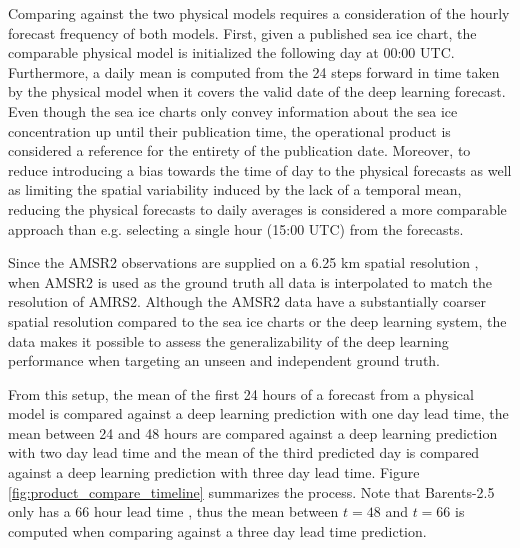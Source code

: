 \documentclass[../main/thesis.tex]{subfiles}
\begin{document}
Comparing against the two physical models requires a consideration of the hourly forecast frequency \citep{Williams2021, Roehrs2022} of both models. First, given a published sea ice chart, the comparable physical model is initialized the following day at 00:00 UTC. Furthermore, a daily mean is computed from the 24 steps forward in time taken by the physical model when it covers the valid date of the deep learning forecast. Even though the sea ice charts only convey information about the sea ice concentration up until their publication time, the operational product is considered a reference for the entirety of the publication date. Moreover, to reduce introducing a bias towards the time of day to the physical forecasts as well as limiting the spatial variability induced by the lack of a temporal mean, reducing the physical forecasts to daily averages is considered a more comparable approach than e.g. selecting a single hour (15:00 UTC) from the forecasts.

Since the AMSR2 observations are supplied on a 6.25 km spatial resolution \citep{Spreen2008}, when AMSR2 is used as the ground truth all data is interpolated to match the resolution of AMRS2. Although the AMSR2 data have a substantially coarser spatial resolution compared to the sea ice charts or the deep learning system, the data makes it possible to assess the generalizability of the deep learning performance when targeting an unseen and independent ground truth.

From this setup, the mean of the first 24 hours of a forecast from a physical model is compared against a deep learning prediction with one day lead time, the mean between 24 and 48 hours are compared against a deep learning prediction with two day lead time and the mean of the third predicted day is compared against a deep learning prediction with three day lead time. Figure \ref{fig:product_compare_timeline} summarizes the process. Note that Barents-2.5 only has a 66 hour lead time \citep{Roehrs2022}, thus the mean between $t = 48$ and $t = 66$ is computed when comparing against a three day lead time prediction.
\end{document}
